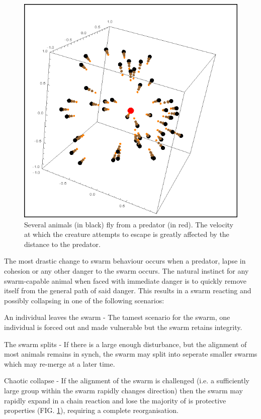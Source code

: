\documentclass[
reprint,
showpacs,preprintnumbers,
amsmath,amssymb,
prl,
]{revtex4-1}
\begin{document}
\begin{figure}[!htp]
	\includegraphics[width=0.7\linewidth]{images/predator.png}

	\caption{
		Several animals (in black) fly from a predator (in red).
		The velocity at which the creature attempts to escape is greatly affected by the distance to the predator.
	}

	\label{fig:animalpredator}
\end{figure}

The most drastic change to swarm behaviour occurs when a predator, lapse in cohesion or any other danger to the swarm occurs.
The natural instinct for any swarm-capable animal when faced with immediate danger is to quickly remove itself from the general path of said danger.
This results in a swarm reacting and possibly collapsing in one of the following scenarios:
\begin{description}
	\item{An individual leaves the swarm -} The tamest scenario for the swarm, one individual is forced out and made vulnerable but the swarm retains integrity.
	\item{The swarm splits -} If there is a large enough disturbance, but the alignment of most animals remains in synch, the swarm may split into seperate smaller swarms which may re-merge at a later time.
	\item{Chaotic collapse -} If the alignment of the swarm is challenged (i.e. a sufficiently large group within the swarm rapidly changes direction) then the swarm may rapidly expand in a chain reaction and lose the majority of is protective properties (FIG. \ref{fig:animalpredator}), requiring a complete reorganisation.
\end{description}
\end{document}
